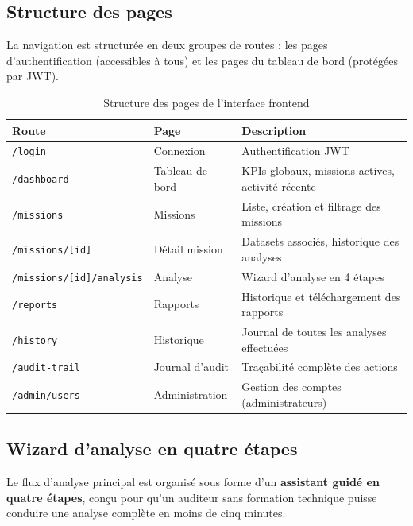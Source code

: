 \documentclass[12pt,a4paper,twoside]{report}
\begin{document}
\subsection{Structure des pages}

La navigation est structurée en deux groupes de routes : les pages d'authentification (accessibles à tous) et les pages du tableau de bord (protégées par JWT).

\begin{table}[H]
\centering
\caption{Structure des pages de l'interface frontend}
\label{tab:frontend_pages}
\begin{tabular}{lll}
\toprule
\textbf{Route} & \textbf{Page} & \textbf{Description} \\
\midrule
\texttt{/login}                   & Connexion       & Authentification JWT \\
\texttt{/dashboard}               & Tableau de bord & KPIs globaux, missions actives, activité récente \\
\texttt{/missions}                & Missions        & Liste, création et filtrage des missions \\
\texttt{/missions/[id]}           & Détail mission  & Datasets associés, historique des analyses \\
\texttt{/missions/[id]/analysis}  & Analyse         & Wizard d'analyse en 4 étapes \\
\texttt{/reports}                 & Rapports        & Historique et téléchargement des rapports \\
\texttt{/history}                 & Historique      & Journal de toutes les analyses effectuées \\
\texttt{/audit-trail}             & Journal d'audit & Traçabilité complète des actions \\
\texttt{/admin/users}             & Administration  & Gestion des comptes (administrateurs) \\
\bottomrule
\end{tabular}
\end{table}

\subsection{Wizard d'analyse en quatre étapes}

Le flux d'analyse principal est organisé sous forme d'un \textbf{assistant guidé en quatre étapes}, conçu pour qu'un auditeur sans formation technique puisse conduire une analyse complète en moins de cinq minutes.
\end{document}
